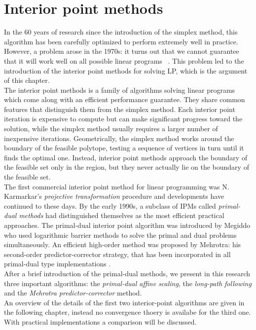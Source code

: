 \documentclass[a4paper,10 pt,titlepage,twoside]{book}
\theoremstyle{plain}
\theoremstyle{definition}
\theoremstyle{remark}
\begin{document}
\chapter{Interior point methods}
In the 60 years of research since the introduction of the simplex method, this algorithm has been carefully optimized to perform extremely well in practice. However, a problem arose in the 1970s: it turns out that we cannot guarantee that it will work well on all possible linear programs ~\cite{3}.
This problem led to the introduction of the interior point methods for solving LP, which is the argument of this chapter.\\The interior point methods is a family of algorithms solving linear programs which come along with an efficient performance guarantee. They share common features that distinguish them from the simplex method. Each interior point iteration is expensive to compute but can make significant progress toward the solution, while the simplex method usually requires a larger number of inexpensive iterations. Geometrically, the simplex method works around the boundary of the feasible polytope, testing a sequence of vertices in turn until it finds the optimal one. Instead, interior point methods approach the boundary of the feasible set only in the region, but they never actually lie on the boundary of the feasible set.\\
The first commercial interior point method for linear programming was N. Karmarkar's  \textit{projective transformation} procedure \cite{Kar} and developments have continued to these days. 
By the early 1990s, a subclass of IPMs called \textit{primal-dual methods} had distinguished themselves as the most efficient practical approaches. The primal-dual interior point algorithm was introduced by Megiddo \cite{meg}  who used logarithmic barrier methods to solve
the primal and dual problems simultaneously. An efficient
high-order method was proposed by Mehrotra: his second-order predictor-corrector
strategy, that has been incorporated in all primal-dual type implementations \cite{MER} .\\ 
After a brief introduction of the primal-dual methods, we present in this research three important algorithms: the \textit{primal-dual affine scaling}, the \textit{long-path following} and the \textit{Mehrotra predictor-corrector} method.\\
An overview of the details of the first two interior-point algorithms are given in the following chapter, instead no convergence thoery is availabe for the third one. With practical implementations a comparison will be discussed.
\end{document}
